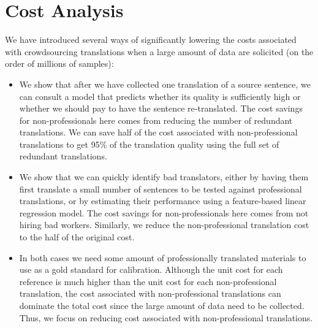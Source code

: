 \documentclass[11pt,letterpaper]{article}
\begin{document}
\section{Cost Analysis}

 We have introduced several ways of significantly lowering the costs associated with crowdsourcing translations when a large amount of data are solicited (on the order of millions of samples):
\begin{itemize}
\setlength\itemsep{0em}
\item We show that after we have collected one translation of a source sentence, we can consult a model that predicts whether its quality is sufficiently high or whether we should pay to have the sentence re-translated.  The cost savings for non-professionals here comes from reducing the number of redundant translations. We can save half of the cost associated with non-professional translations to get 95\% of the translation quality using the full set of redundant translations.
\item We show that we can quickly identify bad translators, either by having them first translate a small number of sentences to be tested against professional translations, or by estimating their performance using a feature-based linear regression model. The cost savings for non-professionals here comes from not hiring bad workers. Similarly, we reduce the non-professional translation cost to the half of the original cost.

\item In both cases we need some amount of professionally translated materials  to use as a gold standard for calibration. Although the unit cost for each reference is much higher than the unit cost for each non-professional translation, the cost associated with non-professional translations can dominate the total cost since the large amount of data need to be collected. Thus, we focus on reducing cost associated with non-professional translations. 
\end{itemize}
%
\end{document}

